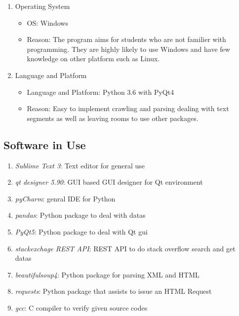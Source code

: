 \documentclass[conference]{IEEEtran}
\begin{document}
\begin{enumerate}
  \item Operating System
  \begin{itemize}
    \item OS: Windows
    \item Reason: The program aims for students who are not familier with programming. They are highly likely to use Windows and have few knowledge on other platform such as Linux.
  \end{itemize}
  \item Language and Platform
  \begin{itemize}
    \item Language and Platform: Python 3.6 with PyQt4
    \item Reason: Easy to implement crawling and parsing dealing with text segments as well as leaving rooms to use other packages.
  \end{itemize}
\end{enumerate}
\textit{}


\subsection{Software in Use} %
\label{sub:software_in_use}

\begin{enumerate}
  \item \textit{Sublime Text 3}: Text editor for general use
  \item \textit{qt designer 5.90}: GUI based GUI designer for Qt environment
  \item \textit{pyCharm}: genral IDE for Python
  \item \textit{pandas}: Python package to deal with datas
  \item \textit{PyQt5}: Python package to deal with Qt gui
  \item \textit{stackexchage REST API}: REST API to do stack overflow search and get datas
  \item \textit{beautifulsoup4}: Python package for parsing XML and HTML
  \item \textit{requests}: Python package that assists to issue an HTML Request
  \item \textit{gcc}: C compiler to verify given source codes
\end{enumerate}
\textit{}
\end{document}
